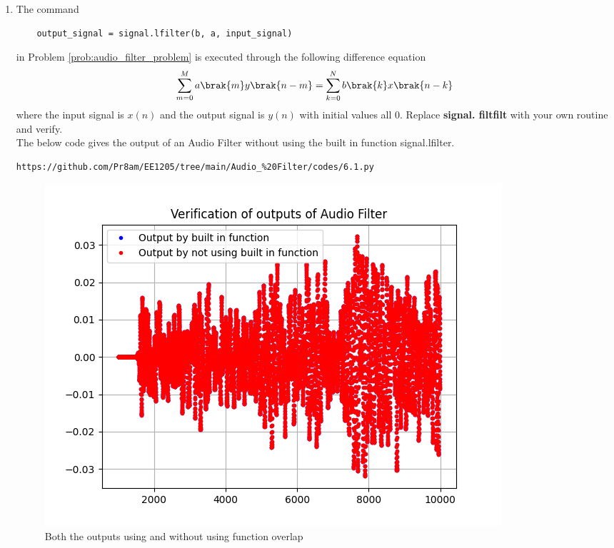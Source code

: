 \documentclass[journal,12pt,twocolumn]{IEEEtran}
\theoremstyle{remark}
\begin{document}
\begin{enumerate}[label=\thesection.\arabic*]
\item
The command
\begin{lstlisting}
	output_signal = signal.lfilter(b, a, input_signal)
	\end{lstlisting}
in Problem \ref{prob:audio_filter_problem} is executed through the following difference equation
\begin{equation}
\label{eq:iir_filter_gen}
 \sum _{m=0}^{M}a\brak{m}y\brak{n-m}=\sum _{k=0}^{N}b\brak{k}x\brak{n-k} 
\end{equation}
%
where the input signal is $x(n)$ and the output signal is $y(n)$ with initial values all 0. Replace
\textbf{signal. filtfilt} with your own routine and verify.\\

\solution The below code gives the output of an Audio Filter without using the built in function signal.lfilter.
\begin{lstlisting}
https://github.com/Pr8am/EE1205/tree/main/Audio_%20Filter/codes/6.1.py 
\end{lstlisting}
\begin{figure}[H]
\centering
\includegraphics[width=\columnwidth]{figs/Audio_Filter_verf.png}
\caption{Both the outputs using and without using function overlap}
\label{fig:6.1}
\end{figure}






\end{enumerate}
\end{document}
